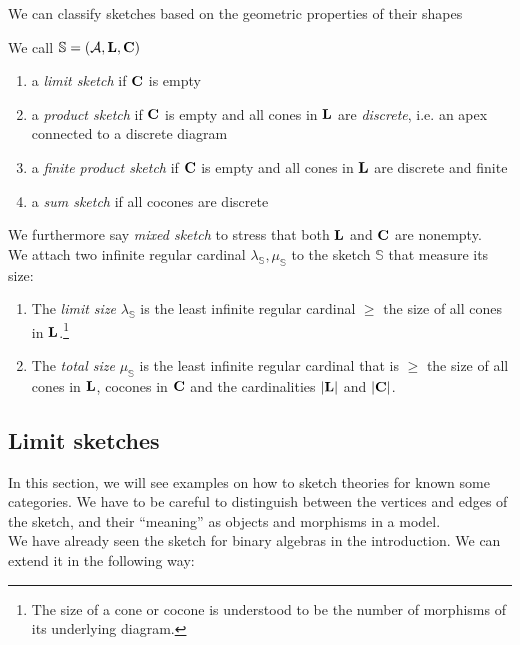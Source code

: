 We can classify sketches based on the geometric properties of their shapes
\begin{Definition}
We call $\mathbb S = (\mathcal{A}, \textbf{L}, \textbf{C})$
\begin{enumerate}
\item a \emph{limit sketch} if $\textbf{C}$ is empty
\item a \emph{product sketch} if $\textbf{C}$ is empty and all cones in $\textbf{L}$ are \emph{discrete}, i.e. an apex connected to a discrete diagram
\item a \emph{finite product sketch} if $\textbf{C}$ is empty and all cones in $\textbf{L}$ are discrete and finite
\item a \emph{sum sketch} if all cocones are discrete
\end{enumerate}
We furthermore say \emph{mixed sketch} to stress that both $\textbf{L}$ and $\textbf{C}$ are nonempty. \\

We attach two infinite regular cardinal $\lambda_\mathbb S, \mu_\mathbb S$ to the sketch $\mathbb S$ that measure its size:
\begin{enumerate}
\item The \emph{limit size} $\lambda_\mathbb S$ is the least infinite regular cardinal $\geq$ the size of all cones in $\textbf{L}$.\footnote{The size of a cone or cocone is understood to be the number of morphisms of its underlying diagram.}

\item The \emph{total size} $\mu_\mathbb S$ is the least infinite regular cardinal that is $\geq$ the size of all cones in $\textbf{L}$, cocones in $\textbf{C}$ and the cardinalities $|\textbf{L}|$ and $|\textbf{C}|$.
\end{enumerate}
\end{Definition}


\subsection{Limit sketches}

In this section, we will see examples on how to sketch theories for known some categories. We have to be careful to distinguish between the vertices and edges of the sketch, and their ``meaning'' as objects and morphisms in a model. \\

We have already seen the sketch for binary algebras in the introduction. We can extend it in the following way:

